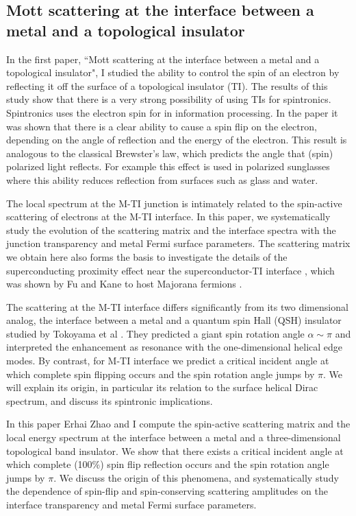 \documentclass[12pt,twocolumn]{article}
\begin{document}
\subsection*{Mott scattering at the interface between a metal and a topological insulator}
In the first paper, ``Mott scattering at the interface between a metal and a topological insulator", I studied the ability to control the spin of an electron by reflecting it off the surface of a topological insulator (TI). The results of this study show that there is a very strong possibility of using TIs for spintronics. Spintronics uses the electron spin for in information processing. In the paper it was shown that there is a clear ability to cause a spin flip on the electron, depending on the angle of reflection and the energy of the electron. This result is analogous to the classical Brewster's law, which predicts the angle that (spin) polarized light reflects. For example this effect is used in polarized sunglasses where this ability reduces reflection from surfaces such as glass and water.

The local spectrum at the M-TI junction is intimately related to the spin-active scattering of electrons at the M-TI interface. In this paper, we systematically study the evolution of the scattering matrix and the interface spectra
with the junction transparency and metal Fermi surface parameters. 
The scattering matrix \cite{mrs} we obtain here also forms the basis to investigate the details of the superconducting proximity effect near the superconductor-TI interface \cite{stan}, which was shown by Fu and Kane to host Majorana fermions \cite{majorana}.

The scattering at the M-TI interface differs significantly from its two dimensional analog, the interface between a metal and a quantum spin Hall (QSH) insulator studied by Tokoyama et al \cite{yokoyama09}. They predicted a giant spin rotation angle $\alpha\sim \pi$ and interpreted the enhancement as resonance with the one-dimensional helical edge modes. By contrast, for M-TI interface we predict a critical incident angle at which complete spin flipping occurs and the spin rotation angle jumps by $\pi$. We will explain its origin, {in particular its relation to the surface helical Dirac spectrum}, and discuss its spintronic implications.


In this paper Erhai Zhao and I compute the spin-active scattering matrix and the local energy spectrum at the interface between a metal and a three-dimensional  topological band insulator. We show that there exists a critical incident angle at which complete (100\%) spin flip reflection occurs and the spin rotation angle jumps by $\pi$. 
We discuss the origin of this phenomena, and systematically study the dependence of spin-flip and spin-conserving scattering amplitudes on the interface transparency and metal Fermi surface parameters.
\end{document}
